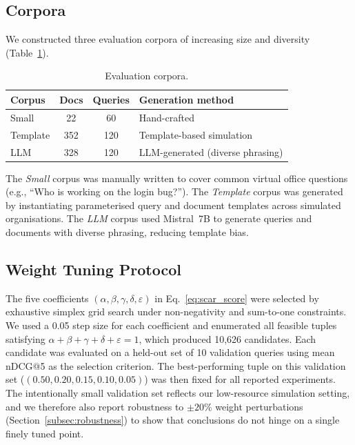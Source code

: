 \documentclass[journal]{IEEEtran}
\begin{document}
\subsection{Corpora}
\label{subsec:corpora}

We constructed three evaluation corpora of increasing size and diversity (Table~\ref{tab:corpora}).

\begin{table}[htbp]
\centering
\caption{Evaluation corpora.}
\label{tab:corpora}
\begin{tabular}{lccp{4.5cm}}
\hline
\textbf{Corpus} & \textbf{Docs} & \textbf{Queries} & \textbf{Generation method} \\
\hline
Small   & 22  & 60  & Hand-crafted \\
Template & 352 & 120 & Template-based simulation \\
LLM     & 328 & 120 & LLM-generated (diverse phrasing) \\
\hline
\end{tabular}
\end{table}

The \emph{Small} corpus was manually written to cover common virtual office questions (e.g., ``Who is working on the login bug?''). The \emph{Template} corpus was generated by instantiating parameterised query and document templates across simulated organisations. The \emph{LLM} corpus used Mistral~7B to generate queries and documents with diverse phrasing, reducing template bias.

\subsection{Weight Tuning Protocol}
\label{subsec:weight_tuning}

The five coefficients $(\alpha, \beta, \gamma, \delta, \varepsilon)$ in
Eq.~\eqref{eq:scar_score} were selected by exhaustive simplex grid
search under non-negativity and sum-to-one constraints.
We used a 0.05 step size for each coefficient and enumerated all
feasible tuples satisfying
$\alpha + \beta + \gamma + \delta + \varepsilon = 1$,
which produced 10{,}626 candidates.
Each candidate was evaluated on a held-out set of 10 validation
queries using mean nDCG@5 as the selection criterion.
The best-performing tuple on this validation set
($(0.50, 0.20, 0.15, 0.10, 0.05)$) was then fixed for all reported
experiments.
The intentionally small validation set reflects our low-resource
simulation setting, and we therefore also report robustness to
$\pm 20\%$ weight perturbations (Section~\ref{subsec:robustness}) to
show that conclusions do not hinge on a single finely tuned point.
\end{document}
